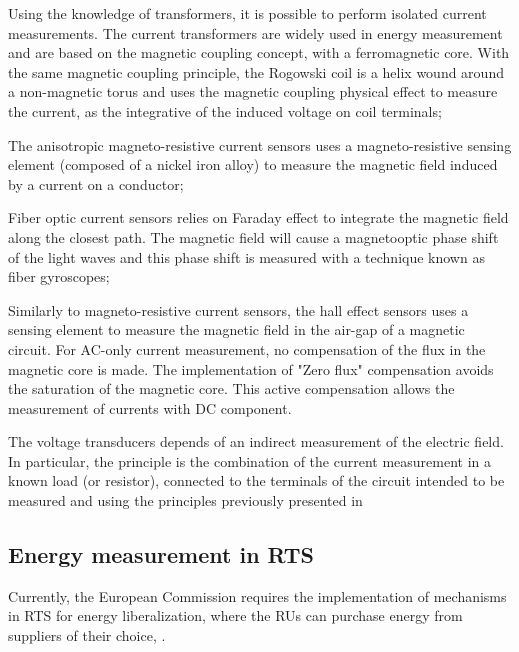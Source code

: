 	\begin{description}
		\setlength\itemsep{-0em}
		\item [Magnetic coupling] Using the knowledge of transformers, it is possible to perform isolated current measurements. The current transformers are widely used in energy measurement and are based on the magnetic coupling concept, with a ferromagnetic core. With the same magnetic coupling principle, the Rogowski coil is a helix wound around a non-magnetic torus and uses the magnetic coupling physical effect to measure the current, as the integrative of the induced voltage on coil terminals;
		\item [Magneto resistance] The anisotropic magneto-resistive current sensors uses a magneto-resistive sensing element (composed of a nickel iron alloy) to measure the magnetic field induced by a current on a conductor;
		\item [Faraday induction] Fiber optic current sensors relies on Faraday effect to integrate the magnetic field along the closest path. The magnetic field will cause a magnetooptic phase shift of the light waves and this phase shift is measured with a technique known as fiber gyroscopes;
		\item [Hall Effect] Similarly to magneto-resistive current sensors, the hall effect sensors uses a sensing element to measure the magnetic field in the air-gap of a magnetic circuit. For AC-only current measurement, no compensation of the flux in the magnetic core is made. The implementation of "Zero flux" compensation avoids the saturation of the magnetic core. This active compensation allows the measurement of currents with DC component.
		
	\end{description}

	The voltage transducers depends of an indirect measurement of the electric field. In particular, the principle is the combination of the current measurement in a known load (or resistor), connected to the terminals of the circuit intended to be measured and using the principles previously presented in 
	

\subsection{Energy measurement in RTS}	
\label{subs:323}

	Currently, the European Commission requires the implementation of mechanisms in \ac{RTS} for energy liberalization, where the \ac{RUs} can purchase energy from suppliers of their choice, \cite{eur-lex2008}.
	
